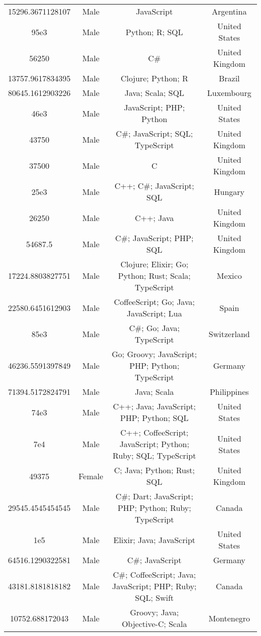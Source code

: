 \begin{center}
\begin{tabular}{ |c|c|c|c| }
15296.3671128107  &  Male  &  JavaScript  &  Argentina  \\ 
95e3  &  Male  &  Python; R; SQL  &  United States  \\ 
56250  &  Male  &  C\#  &  United Kingdom  \\ 
13757.9617834395  &  Male  &  Clojure; Python; R  &  Brazil  \\ 
80645.1612903226  &  Male  &  Java; Scala; SQL  &  Luxembourg  \\ 
46e3  &  Male  &  JavaScript; PHP; Python  &  United States  \\ 
43750  &  Male  &  C\#; JavaScript; SQL; TypeScript  &  United Kingdom  \\ 
37500  &  Male  &  C  &  United Kingdom  \\ 
25e3  &  Male  &  C++; C\#; JavaScript; SQL  &  Hungary  \\ 
26250  &  Male  &  C++; Java  &  United Kingdom  \\ 
54687.5  &  Male  &  C\#; JavaScript; PHP; SQL  &  United Kingdom  \\ 
17224.8803827751  &  Male  &  Clojure; Elixir; Go; Python; Rust; Scala; TypeScript  &  Mexico  \\ 
22580.6451612903  &  Male  &  CoffeeScript; Go; Java; JavaScript; Lua  &  Spain  \\ 
85e3  &  Male  &  C\#; Go; Java; TypeScript  &  Switzerland  \\ 
46236.5591397849  &  Male  &  Go; Groovy; JavaScript; PHP; Python; TypeScript  &  Germany  \\ 
71394.5172824791  &  Male  &  Java; Scala  &  Philippines  \\ 
74e3  &  Male  &  C++; Java; JavaScript; PHP; Python; SQL  &  United States  \\ 
7e4  &  Male  &  C++; CoffeeScript; JavaScript; Python; Ruby; SQL; TypeScript  &  United States  \\ 
49375  &  Female  &  C; Java; Python; Rust; SQL  &  United Kingdom  \\ 
29545.4545454545  &  Male  &  C\#; Dart; JavaScript; PHP; Python; Ruby; TypeScript  &  Canada  \\ 
1e5  &  Male  &  Elixir; Java; JavaScript  &  United States  \\ 
64516.1290322581  &  Male  &  C\#; JavaScript  &  Germany  \\ 
43181.8181818182  &  Male  &  C\#; CoffeeScript; Java; JavaScript; PHP; Ruby; SQL; Swift  &  Canada  \\ 
10752.688172043  &  Male  &  Groovy; Java; Objective-C; Scala  &  Montenegro  \\ 

\end{tabular}
\end{center}
